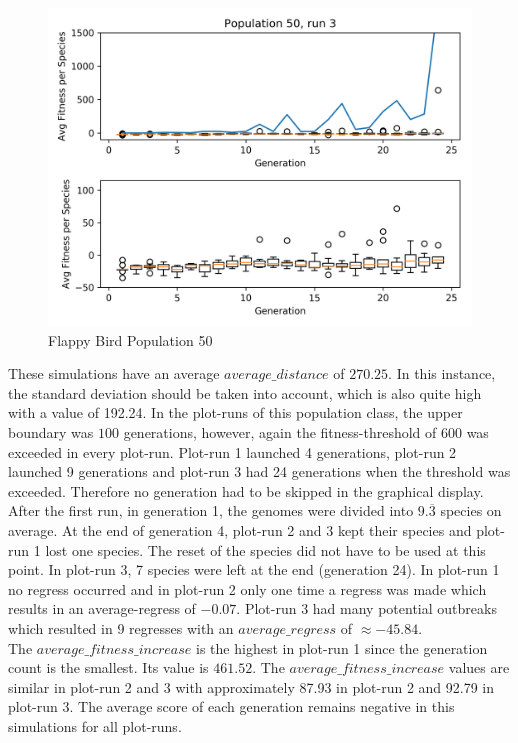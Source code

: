 \begin{figure}[h]
				\begin{minipage}{0.33\textwidth}
					\centering
					\includegraphics[width=1\textwidth]{graphics/flappy/pop50_run3} %
				\end{minipage}
				\caption{Flappy Bird Population 50}
				\label{fig:flappy50}
			\end{figure}
			These simulations have an average $average\_distance$ of $270.25$. In this instance, the standard deviation should be taken into account, which is also quite high with a value of 192.24. 
			In the plot-runs of this population class, the upper boundary was $100$ generations, however, again the fitness-threshold of 600 was exceeded in every plot-run. Plot-run 1 launched 4 generations, plot-run 2 launched 9 generations and plot-run 3 had 24 generations when the threshold was exceeded. Therefore no generation had to be skipped in the graphical display.\\
			After the first run, in generation 1, the genomes were divided into $9.\overline{3}$ species on average. At the end of generation 4, plot-run 2 and 3 kept their species and plot-run 1 lost one species. The reset of the species did not have to be used at this point. In plot-run 3, 7 species were left at the end (generation 24).
			In plot-run 1 no regress occurred and in plot-run 2 only one time a regress was made which results in an average-regress of $-0.07$. Plot-run 3 had many potential outbreaks which resulted in 9 regresses with an $average\_regress$ of $\approx-45.84$.\\
			The $average\_fitness\_increase$ is the highest in plot-run 1 since the generation count is the smallest. Its value is $461.52$. The $average\_fitness\_increase$ values are similar in plot-run 2 and 3 with approximately 87.93 in plot-run 2 and 92.79 in plot-run 3. The average score of each generation remains negative in this simulations for all plot-runs.
		
